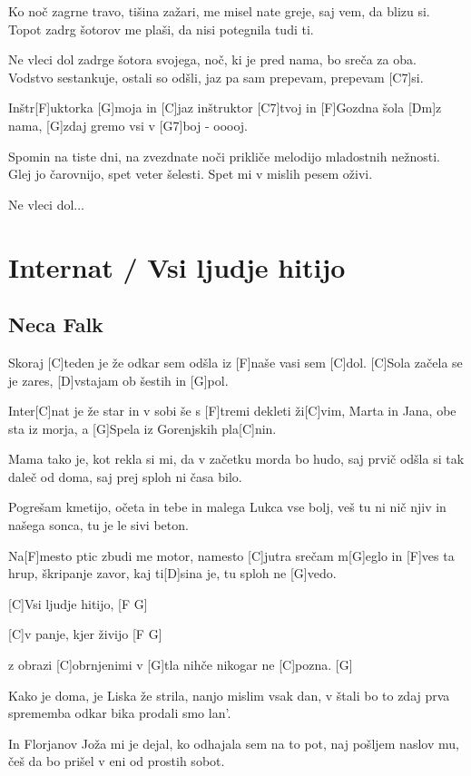 \documentclass[a4paper,12pt]{article}
\begin{document}
\begin{multicols}{2}
\begin{guitar}
Ko noč zagrne travo, tišina zažari,
me misel nate greje, saj vem, da blizu si.
Topot zadrg šotorov me plaši,
da nisi potegnila tudi ti.

 
Ne vleci dol zadrge šotora svojega,
noč, ki je pred nama, bo sreča za oba.
Vodstvo sestankuje, ostali so odšli,
jaz pa sam prepevam, prepevam [C7]si.	
 

Inštr[F]uktorka [G]moja in [C]jaz inštruktor [C7]tvoj
in [F]Gozdna šola [Dm]z nama, 
[G]zdaj gremo vsi v [G7]boj - ooooj.
 

Spomin na tiste dni, na zvezdnate noči
prikliče melodijo mladostnih nežnosti.
Glej jo čarovnijo, spet veter šelesti.
Spet mi v mislih pesem oživi.


Ne vleci dol...

\end{guitar}
\section{Internat / Vsi ljudje hitijo}
\subsection*{Neca Falk}
\begin{guitar}
Skoraj [C]teden je že
odkar sem odšla iz
[F]naše vasi sem [C]dol.
[C]Sola začela se je zares,
[D]vstajam ob šestih in [G]pol.


Inter[C]nat je že star in
v sobi še s [F]tremi dekleti ži[C]vim,
Marta in Jana, obe sta iz morja,
a [G]Spela iz Gorenjskih pla[C]nin.


Mama tako je, kot rekla si mi,
da v začetku morda bo hudo,
saj prvič odšla si tak daleč od doma,
saj prej sploh ni časa bilo.


Pogrešam kmetijo, očeta in tebe
in malega Lukca vse bolj,
veš tu ni nič njiv in našega sonca,
tu je le sivi beton.


Na[F]mesto ptic zbudi me motor,
namesto [C]jutra srečam m[G]eglo
in [F]ves ta hrup, škripanje zavor,
kaj ti[D]sina je, tu sploh ne [G]vedo.


[C]Vsi ljudje hitijo, [F G]

[C]v panje, kjer živijo [F G]

z obrazi [C]obrnjenimi v [G]tla
nihče nikogar ne [C]pozna. [G]


Kako je doma, je Liska že strila,
nanjo mislim vsak dan,
v štali bo to zdaj prva sprememba
odkar bika prodali smo lan'.


In Florjanov Joža mi je dejal,
ko odhajala sem na to pot,
naj pošljem naslov mu,
češ da bo prišel v eni od prostih sobot.



\end{guitar}
\end{multicols}
\end{document}
